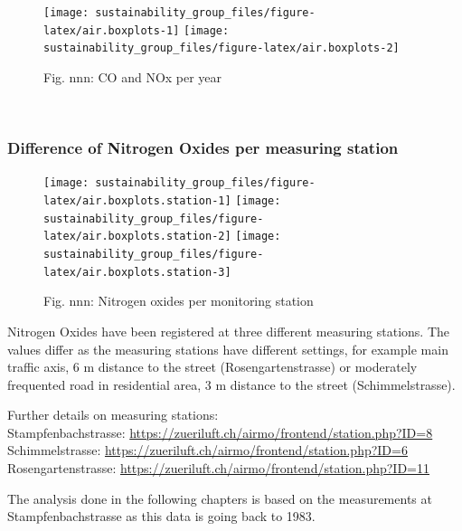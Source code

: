 \documentclass[
]{article}
\begin{document}
\begin{figure}

{\centering \texttt{[image: sustainability\_group\_files/figure-latex/air.boxplots-1]} \texttt{[image: sustainability\_group\_files/figure-latex/air.boxplots-2]} 

}

\caption{Fig. nnn: CO and NOx per year}\label{fig:air.boxplots}
\end{figure}

~

\hypertarget{difference-of-nitrogen-oxides-per-measuring-station}{%
\subsubsection{Difference of Nitrogen Oxides per measuring
station}\label{difference-of-nitrogen-oxides-per-measuring-station}}

\hfill\break

\begin{figure}

{\centering \texttt{[image: sustainability\_group\_files/figure-latex/air.boxplots.station-1]} \texttt{[image: sustainability\_group\_files/figure-latex/air.boxplots.station-2]} \texttt{[image: sustainability\_group\_files/figure-latex/air.boxplots.station-3]} 

}

\caption{Fig. nnn: Nitrogen oxides per monitoring station}\label{fig:air.boxplots.station}
\end{figure}

Nitrogen Oxides have been registered at three different measuring
stations. The values differ as the measuring stations have different
settings, for example main traffic axis, 6 m distance to the street
(Rosengartenstrasse) or moderately frequented road in residential area,
3 m distance to the street (Schimmelstrasse).

Further details on measuring stations:\\
Stampfenbachstrasse:
\url{https://zueriluft.ch/airmo/frontend/station.php?ID=8}\\
Schimmelstrasse:
\url{https://zueriluft.ch/airmo/frontend/station.php?ID=6}\\
Rosengartenstrasse:
\url{https://zueriluft.ch/airmo/frontend/station.php?ID=11}

\hfill\break

The analysis done in the following chapters is based on the measurements
at Stampfenbachstrasse as this data is going back to 1983.
\end{document}
